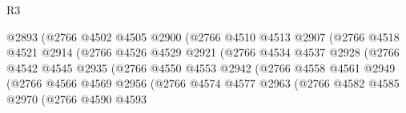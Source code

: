 \begin{lexlean}{R3}
\begin{coremodule}
                                    @2893
                                    (@2766
                                      @4502
                                      @4505
                                      @2900
                                      (@2766
                                        @4510
                                        @4513
                                        @2907
                                        (@2766
                                          @4518
                                          @4521
                                          @2914
                                          (@2766
                                            @4526
                                            @4529
                                            @2921
                                            (@2766
                                              @4534
                                              @4537
                                              @2928
                                              (@2766
                                                @4542
                                                @4545
                                                @2935
                                                (@2766
                                                  @4550
                                                  @4553
                                                  @2942
                                                  (@2766
                                                    @4558
                                                    @4561
                                                    @2949
                                                    (@2766
                                                      @4566
                                                      @4569
                                                      @2956
                                                      (@2766
                                                        @4574
                                                        @4577
                                                        @2963
                                                        (@2766
                                                          @4582
                                                          @4585
                                                          @2970
                                                          (@2766
                                                            @4590
                                                            @4593

\end{coremodule}
\end{lexlean}
